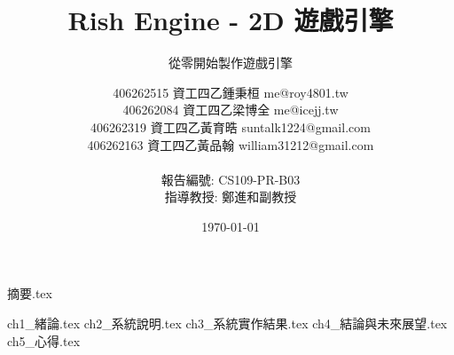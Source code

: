 \documentclass[a4paper, 12pt]{report}
\institute{輔仁大學資訊工程學系專題報告}
\title{Rish Engine - 2D 遊戲引擎}
\subtitle{從零開始製作遊戲引擎}
\author{
    \raggedright
    \hspace{2.5cm} 406262515 資工四乙\enspace 鍾秉桓 me@roy4801.tw \\
    \hspace{2.5cm} 406262084 資工四乙\enspace 梁博全 me@icejj.tw \\
    \hspace{2.5cm} 406262319 資工四乙\enspace 黃育晧 suntalk1224@gmail.com \\
    \hspace{2.5cm} 406262163 資工四乙\enspace 黃品翰 william31212@gmail.com \\
    \ \\
    \centering
    報告編號: CS109-PR-B03 \\
    指導教授: 鄭進和\enspace 副教授 \\
}
\date{\today}
\begin{document}
    \maketitle
    {摘要.tex}

    \romantableofcontents
    \listoffigures
    \listoftables

    {ch1_緒論.tex}
    {ch2_系統說明.tex}
    {ch3_系統實作結果.tex}
    {ch4_結論與未來展望.tex}
    {ch5_心得.tex}

    \printbibliography
\end{document}
